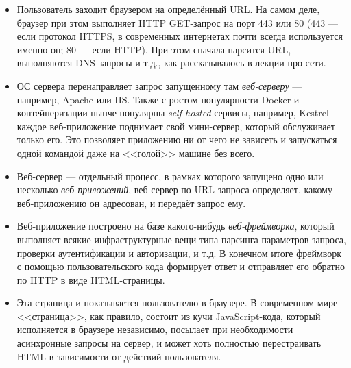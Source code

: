 \documentclass{../../text-style}
\begin{document}
\begin{itemize}
    \item Пользователь заходит браузером на определённый URL. На самом деле, браузер при этом выполняет HTTP GET-запрос на порт 443 или 80 (443 --- если протокол HTTPS, в современных интернетах почти всегда используется именно он; 80 --- если HTTP). При этом сначала парсится URL, выполняются DNS-запросы и т.д., как рассказывалось в лекции про сети.
    \item ОС сервера перенаправляет запрос запущенному там \emph{веб-серверу} --- например, Apache или IIS. Также с ростом популярности Docker и контейнеризации нынче популярны \emph{self-hosted} сервисы, например, Kestrel --- каждое веб-приложение поднимает свой мини-сервер, который обслуживает только его. Это позволяет приложению ни от чего не зависеть и запускаться одной командой даже на <<голой>> машине без всего.
    \item Веб-сервер --- отдельный процесс, в рамках которого запущено одно или несколько \emph{веб-приложений}, веб-сервер по URL запроса определяет, какому веб-приложению он адресован, и передаёт запрос ему.
    \item Веб-приложение построено на базе какого-нибудь \emph{веб-фреймворка}, который выполняет всякие инфраструктурные вещи типа парсинга параметров запроса, проверки аутентификации и авторизации, и т.д. В конечном итоге фреймворк с помощью пользовательского кода формирует ответ и отправляет его обратно по HTTP в виде HTML-страницы.
    \item Эта страница и показывается пользователю в браузере. В современном мире <<страница>>, как правило, состоит из кучи JavaScript-кода, который исполняется в браузере независимо, посылает при необходимости асинхронные запросы на сервер, и может хоть полностью перестраивать HTML в зависимости от действий пользователя.
\end{itemize}
\end{document}
